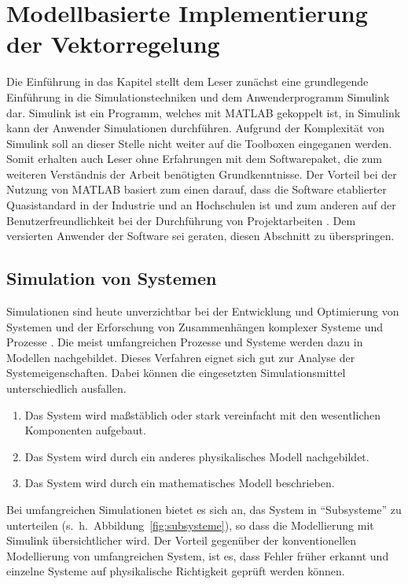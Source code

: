 
\chapter{Modellbasierte Implementierung der Vektorregelung}
\label{cha:regelungpmsm}

Die Einführung in das Kapitel stellt dem Leser zunächst eine grundlegende Einführung in die Simulationstechniken und dem Anwenderprogramm Simulink dar.
Simulink ist ein Programm, welches mit MATLAB gekoppelt ist, in Simulink kann der Anwender Simulationen durchführen.
Aufgrund der Komplexität von Simulink soll an dieser Stelle nicht weiter auf die Toolboxen eingeganen werden.
Somit erhalten auch Leser ohne Erfahrungen mit dem Softwarepaket, die zum weiteren Verständnis der Arbeit benötigten Grundkenntnisse.
Der Vorteil bei der Nutzung von MATLAB basiert zum einen darauf, dass die Software etablierter Quasistandard in der Industrie und an Hochschulen ist und zum anderen auf der Benutzerfreundlichkeit bei der Durchführung von Projektarbeiten \autocite{scherf2010}.
Dem versierten Anwender der Software sei geraten, diesen Abschnitt zu überspringen.

\section{Simulation von Systemen}\label{sec:simulation}

Simulationen sind heute unverzichtbar bei der Entwicklung und Optimierung von Systemen und der Erforschung von Zusammenhängen komplexer Systeme und Prozesse \autocite{brychta}.
Die meist umfangreichen Prozesse und Systeme werden dazu in Modellen nachgebildet.
Dieses Verfahren eignet sich gut zur Analyse der Systemeigenschaften.
Dabei können die eingesetzten Simulationsmittel unterschiedlich ausfallen.

\begin{enumerate}
	\item Das System wird maßstäblich oder stark vereinfacht mit den wesentlichen Komponenten aufgebaut.
	\item Das System wird durch ein anderes physikalisches Modell nachgebildet.
	\item Das System wird durch ein mathematisches Modell beschrieben.
\end{enumerate}

Bei umfangreichen Simulationen bietet es sich an, das System in \enquote{Subsysteme} zu unterteilen (s.~h.~Abbildung~\ref{fig:subsysteme}), so dass die Modellierung mit Simulink übersichtlicher wird.
Der Vorteil gegenüber der konventionellen Modellierung von umfangreichen System, ist es, dass Fehler früher erkannt und einzelne Systeme auf physikalische Richtigkeit geprüft werden können.

